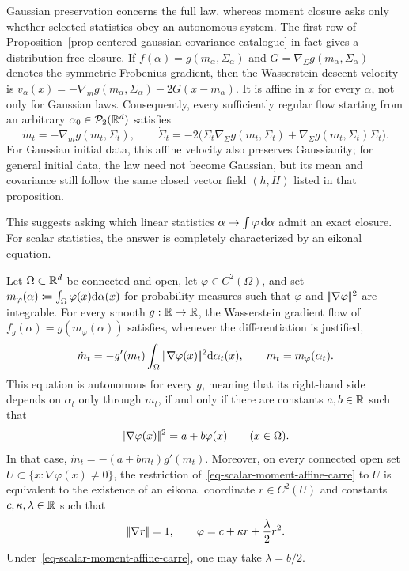 Gaussian preservation concerns the full law, whereas moment closure asks only whether selected statistics obey an autonomous system. The first row of Proposition~\ref{prop-centered-gaussian-covariance-catalogue} in fact gives a distribution-free closure. If $f(\alpha)=g(m_\alpha,\Sigma_\alpha)$ and $G=\nabla_\Sigma g(m_\alpha,\Sigma_\alpha)$ denotes the symmetric Frobenius gradient, then the Wasserstein descent velocity is
\(v_\alpha(x)=-\nabla_m g(m_\alpha,\Sigma_\alpha)-2G(x-m_\alpha)\).
It is affine in $x$ for every $\alpha$, not only for Gaussian laws. Consequently, every sufficiently regular flow starting from an arbitrary $\alpha_0\in\mathcal{P}_2(\mathbb{R}^d)$ satisfies
\begin{equation}\label{eq-distribution-free-mean-covariance-closure}
	\dot m_t=-\nabla_m g(m_t,\Sigma_t),
	\qquad
	\dot\Sigma_t
	=
	-2\bigl(\Sigma_t\nabla_\Sigma g(m_t,\Sigma_t)
	+\nabla_\Sigma g(m_t,\Sigma_t)\Sigma_t\bigr).
\end{equation}
For Gaussian initial data, this affine velocity also preserves Gaussianity; for general initial data, the law need not become Gaussian, but its mean and covariance still follow the same closed vector field $(h,H)$ listed in that proposition.

This suggests asking which linear statistics $\alpha\mapsto\int\varphi\,\mathrm{d}\alpha$ admit an exact closure. For scalar statistics, the answer is completely characterized by an eikonal equation.

\begin{prop}\label{prop-scalar-moment-closure}
	Let $\Omega\subset\mathbb{R}^d$ be connected and open, let $\varphi\in C^2(\Omega)$, and set
	\(m_\varphi(\alpha)\coloneqq\int_\Omega\varphi(x)\mathrm{d}\alpha(x)\)
	for probability measures such that $\varphi$ and $|\!| \nabla\varphi |\!|^2$ are integrable. For every smooth $g:\mathbb{R}\to\mathbb{R}$, the Wasserstein gradient flow of $f_g(\alpha)=g(m_\varphi(\alpha))$ satisfies, whenever the differentiation is justified,
	\[
		\dot m_t
		=
		-g'(m_t)\int_\Omega|\!| \nabla\varphi(x) |\!|^2\mathrm{d}\alpha_t(x),
		\qquad m_t=m_\varphi(\alpha_t).
	\]
	This equation is autonomous for every $g$, meaning that its right-hand side depends on $\alpha_t$ only through $m_t$, if and only if there are constants $a,b\in\mathbb{R}$ such that
	\begin{equation}\label{eq-scalar-moment-affine-carre}
		|\!| \nabla\varphi(x) |\!|^2=a+b\varphi(x)
		\qquad (x\in\Omega).
	\end{equation}
	In that case, $\dot m_t=-(a+b m_t)g'(m_t)$.
	Moreover, on every connected open set $U\subset\{x:\nabla\varphi(x)\neq0\}$, the restriction of~\eqref{eq-scalar-moment-affine-carre} to $U$ is equivalent to the existence of an eikonal coordinate $r\in C^2(U)$ and constants $c,\kappa,\lambda\in\mathbb{R}$ such that
	\begin{equation}\label{eq-scalar-moment-eikonal-form}
		|\!| \nabla r |\!|=1,
		\qquad
		\varphi=c+\kappa r+\frac{\lambda}{2}r^2.
	\end{equation}
	Under~\eqref{eq-scalar-moment-affine-carre}, one may take $\lambda=b/2$.
\end{prop}

